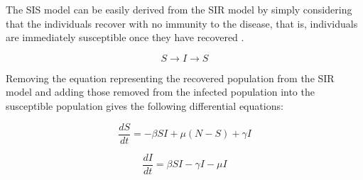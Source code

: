 The SIS model can be easily derived from the SIR model by simply considering that the individuals recover with no immunity to the disease, that is, individuals are immediately susceptible once they have recovered \cite{per14}.

\begin{equation}
S \rightarrow I \rightarrow S
\end{equation}

Removing the equation representing the recovered population from the SIR model and adding those removed from the infected population into the susceptible population gives the following differential equations:

\begin{equation}
\frac{dS}{dt} = -\beta S I + \mu(N - S) + \gamma I
\end{equation}

\begin{equation}
\frac{dI}{dt} = \beta S I - \gamma I - \mu I
\end{equation}